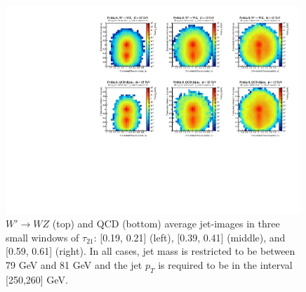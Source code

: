 \begin{figure}[h!]
  \begin{center}
  
        \includegraphics[width=0.99\textwidth]{figures/averages_fixed_nonorm.pdf}

      \caption{
        $W'\rightarrow WZ$ (top) and QCD (bottom) average jet-images in three small windows of $\tau_{21}$: [0.19, 0.21] (left), [0.39, 0.41] (middle), and [0.59, 0.61] (right).  In all cases, jet mass is restricted to be between 79 GeV and 81 GeV and the jet $p_T$ is required to be in the interval [250,260] GeV.
        \label{fig:meanImagesWindow} 
      }
    \end{center}
\end{figure}  

